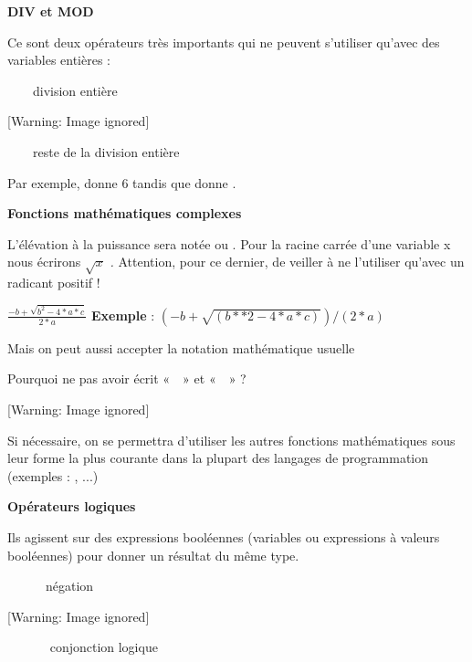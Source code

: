 {\sffamily\bfseries
DIV et MOD}

{
Ce sont deux opérateurs très importants qui ne peuvent s’utiliser
qu’avec des variables entières :}

{
 \ \ \ \ division entière}

\begin{center}
 [Warning: Image ignored] %

\end{center}
{
 \ \ \ \ reste de la division entière}

{
Par exemple,  donne 6 tandis que
 donne .}

{\sffamily\bfseries\upshape
Fonctions mathématiques complexes}

{
L’élévation à la puissance sera notée \textstyleCodeInsr{**} ou
\textstyleCodeInsr{\^{}} . Pour la racine carrée d’une variable x nous
écrirons  $\sqrt{x}$ \textit{.} Attention, pour ce dernier, de veiller
à ne l’utiliser qu’avec un radicant positif !}

{
 $\frac{-b+\sqrt{b^{2}-4\ast a\ast c}}{2\ast a}$ \textbf{Exemple} : 
$(-b+\sqrt{(b\ast \ast 2-4\ast a\ast c)})/(2\ast a)$ }

{
Mais on peut aussi accepter la notation mathématique usuelle }

{
Pourquoi ne pas avoir écrit «~~» et
«~~» ?}

\begin{center}
 [Warning: Image ignored] %

\end{center}
{
Si nécessaire, on se permettra d'utiliser les autres
fonctions mathématiques sous leur forme la plus courante dans la
plupart des langages de programmation (exemples :
, ...)}

{\sffamily\bfseries
Opérateurs logiques}

{
Ils agissent sur des expressions booléennes (variables ou expressions à
valeurs booléennes) pour donner un résultat du même type.}

{
\ \ \ \ \ \ négation}

\begin{center}
 [Warning: Image ignored] %

\end{center}
{
\ \  \ \ \ \ conjonction logique}

